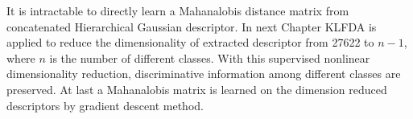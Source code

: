 It is intractable to directly learn a Mahanalobis distance matrix from concatenated Hierarchical Gaussian descriptor. In next Chapter KLFDA is applied to reduce the dimensionality of extracted descriptor from 27622 to $n-1$, where $n$ is the number of different classes. With this supervised nonlinear dimensionality reduction, discriminative information among different classes are preserved. At last a Mahanalobis matrix is learned on the dimension reduced descriptors by gradient descent method.




%
